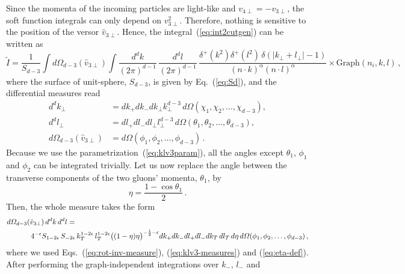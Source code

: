 \documentclass[a4paper,11pt]{article}
\newcommand{\gdp}{\text{Graph}(n_i, k, l)}
\numberwithin{equation}{section}
\begin{document}
Since the momenta of the incoming particles are light-like and $v_{4\perp} =
-v_{3\perp}$, the soft function integrals can only depend on $v_{3\perp}^2$.
Therefore, nothing is sensitive to the position of the versor $\hat v_{3\perp}$.
Hence, the integral~(\ref{eq:int2cutgen}) can be written as
%
\begin{equation}
  \tilde I = 
  \frac{1}{S_{d-3}}
  \int d\Omega_{d-3} (\hat v_{3\perp})
  \int \frac{d^d k}{(2\pi)^{d-1}}\, \frac{d^d l}{(2\pi)^{d-1}}\, 
  \frac{\delta^+(k^2) \delta^+(l^2)\,
  \delta(|k_\perp+l_\perp|-1)}
  {(n\cdot k)^{\alpha} (n\cdot l)^\alpha}
  \times \gdp\,,
\end{equation}
%
where the surface of unit-sphere, $S_{d-3}$, is given by Eq.~(\ref{eq:Sd}),
and the differential measures  read
%
\begin{subequations}
  \label{eq:klv3-measures}
  \begin{align}
   d^{d}k_\perp & =  dk_+ dk_- d k_\perp  k_\perp^{d-3}\,
   d\Omega(\chi_1,\chi_2, \dots, \chi_{d-3}),
   \\[0.5em]
   d^{d} l_\perp & =  dl_+ dl_- d l_\perp  l_\perp^{d-3}\,
   d\Omega(\theta_1,\theta_2, \dots, \theta_{d-3}),
   \\[0.5em]
   d\Omega_{d-3} (\hat v_{3\perp}) & =  
   d\Omega(\phi_1,\phi_2, \dots, \phi_{d-3})\,.
  \end{align}
\end{subequations}
%
Because we use the parametrization~(\ref{eq:klv3param}),
all the angles except $\theta_1$, $\phi_1$  and $\phi_2$ can be
integrated trivially. 
%
Let us now replace the angle between the transverse components of the two
gluons' momenta, $\theta_1$, by
%
\begin{equation}
  \eta = \frac{1-\cos\theta_1}{2}\,.
  \label{eq:eta-def}
\end{equation}
%
Then, the whole measure takes the form
%
%
\begin{align}
  d\Omega_{d-3} (\hat v_{3\perp})\,
  d^d k\, d^d l & =
  \\
  &
  \hspace{-50pt}
  4^{-\epsilon}
  S_{1-2\epsilon}\,
  S_{-2\epsilon}\,
  k_T^{1-2\epsilon} \,
  l_T^{1-2\epsilon} 
  \big((1-\eta)\eta \big)^{-\frac12-\epsilon}
  dk_+ dk_- dl_+ dl_-
  d k_T\, 
  d l_T\,
  d\eta\,
  d\Omega(\phi_1, \phi_2, \ldots, \phi_{d-3})\,,
  \nonumber
\end{align}
%
where we used Eqs.~(\ref{eq:rot-inv-measure}), (\ref{eq:klv3-measures}) and
(\ref{eq:eta-def}).
%
After performing the graph-independent integrations over $k_-$, $l_-$ and
\end{document}

